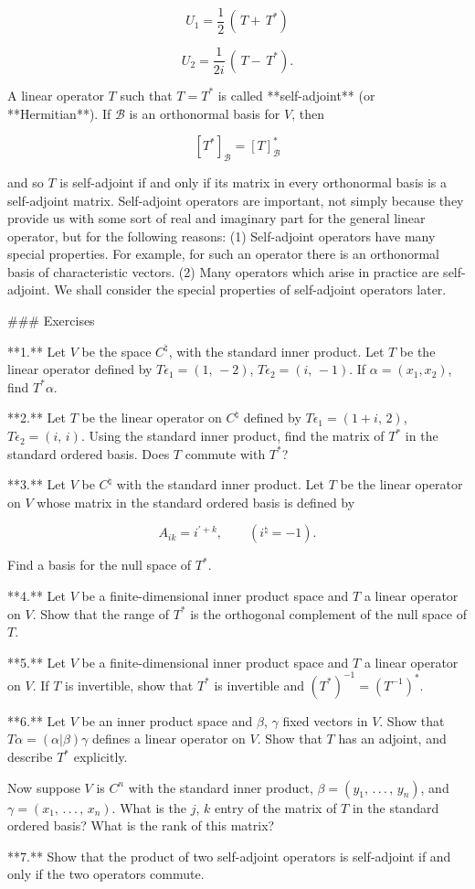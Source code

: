 \[U_{1}=\frac{1}{2}\,(\,T+\,T^{*})\]

\[U_{2}=\frac{1}{2i}\,(\,T-\,T^{*}).\]

A linear operator \(T\) such that \(T=T^{*}\) is called **self-adjoint** (or **Hermitian**). If \(\mathcal{B}\) is an orthonormal basis for \(V\), then

\[[T^{*}]_{\mathcal{B}}=[T]_{\mathcal{B}}^{*}\]

and so \(T\) is self-adjoint if and only if its matrix in every orthonormal basis is a self-adjoint matrix. Self-adjoint operators are important, not simply because they provide us with some sort of real and imaginary part for the general linear operator, but for the following reasons: (1) Self-adjoint operators have many special properties. For example, for such an operator there is an orthonormal basis of characteristic vectors. (2) Many operators which arise in practice are self-adjoint. We shall consider the special properties of self-adjoint operators later.

### Exercises

**1.** Let \(V\) be the space \(C^{\natural}\), with the standard inner product. Let \(T\) be the linear operator defined by \(T\epsilon_{1}=(1,\,-2)\), \(T\epsilon_{2}=(i,\,-1)\). If \(\alpha=(x_{1},x_{2})\), find \(T^{*}\alpha\).

**2.** Let \(T\) be the linear operator on \(C^{\natural}\) defined by \(T\epsilon_{1}=(1+i,\,2)\), \(T\epsilon_{2}=(i,\,i)\). Using the standard inner product, find the matrix of \(T^{*}\) in the standard ordered basis. Does \(T\) commute with \(T^{*}\)?

**3.** Let \(V\) be \(C^{\natural}\) with the standard inner product. Let \(T\) be the linear operator on \(V\) whose matrix in the standard ordered basis is defined by

\[A_{ik}=i^{\prime+k},\qquad(i^{\natural}=-1).\]

Find a basis for the null space of \(T^{*}\).

**4.** Let \(V\) be a finite-dimensional inner product space and \(T\) a linear operator on \(V\). Show that the range of \(T^{*}\) is the orthogonal complement of the null space of \(T\).

**5.** Let \(V\) be a finite-dimensional inner product space and \(T\) a linear operator on \(V\). If \(T\) is invertible, show that \(T^{*}\) is invertible and \((T^{*})^{-1}=(T^{-1})^{*}\).

**6.** Let \(V\) be an inner product space and \(\beta\), \(\gamma\) fixed vectors in \(V\). Show that \(T\alpha=(\alpha|\beta)\gamma\) defines a linear operator on \(V\). Show that \(T\) has an adjoint, and describe \(T^{*}\) explicitly.

Now suppose \(V\) is \(C^{n}\) with the standard inner product, \(\beta=(y_{1},\,.\,.\,.\,,\,y_{n})\), and \(\gamma=(x_{1},\,.\,.\,.\,,\,x_{n})\). What is the \(j\), \(k\) entry of the matrix of \(T\) in the standard ordered basis? What is the rank of this matrix?

**7.** Show that the product of two self-adjoint operators is self-adjoint if and only if the two operators commute.

 